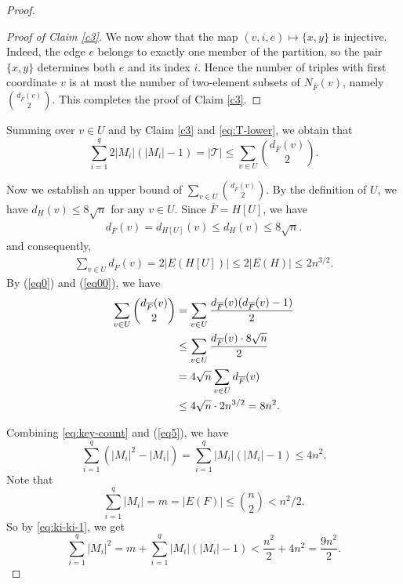 \documentclass[10pt,a4paper]{amsart}
\begin{document}
\begin{proof}
\begin{proof}[Proof of Claim \ref{c3}]
We now show that the map $(v,i,e)\mapsto \{x,y\}$ is injective.  
Indeed, the edge $e$ belongs to exactly one member of the partition, so the pair $\{x,y\}$ determines both $e$ and its index $i$.  
Hence the number of triples with first coordinate $v$ is at most the number of two-element subsets of
$N_{\overline F}(v)$, namely $\binom{d_{\overline {F}}(v)}{2}$. This completes the proof of Claim \ref{c3}.  
\end{proof}


Summing over $v\in U$ and by Claim \ref{c3} and \eqref{eq:T-lower}, we obtain that 
\begin{equation}\label{eq:key-count}
\sum_{i=1}^q 2|M_i|(|M_i|-1)=|\mathcal T|
\le \sum_{v\in U}\binom{d_{\overline {F}}(v)}{2}.
\end{equation}

Now we establish an upper bound of $\sum_{v\in U}\binom{d_{\overline {F}}(v)}{2}$.
By the definition of $U$, we have $d_H(v)\le 8\sqrt n$ for any $v\in U$.
 Since $\overline {F}=H[U]$, we have 
 \begin{align}\label{eq0}
 d_{\overline {F}}(v)=d_{H[U]}(v)\le d_H(v)\le 8\sqrt n.
 \end{align}
and consequently,
\begin{align}\label{eq00}
\sum_{v\in U}d_{\overline {F}}(v)=2|E(H[U])|
\le 2|E(H)|\le 2n^{3/2}.
\end{align}
By (\ref{eq0}) and (\ref{eq00}), we have
\begin{align}\label{eq5}
\sum_{v\in U}\binom{d_{\overline {F}}(v)}{2}&=\sum_{v\in U}\frac{d_{\overline {F}}(v)(d_{\overline {F}}(v)-1)}{2}\notag\\
&\le \sum_{v\in U} \frac{d_{\overline {F}}(v)\cdot 8\sqrt n}{2}\notag\\
&= 4\sqrt n\sum_{v\in U}d_{\overline {F}}(v)\notag\\
&\le 4\sqrt n\cdot 2n^{3/2}=8n^2.
\end{align}


Combining \eqref{eq:key-count} and (\ref{eq5}), we have
\begin{equation}\label{eq:ki-ki-1}
\sum_{i=1}^q (|M_i|^2-|M_i|)=\sum_{i=1}^q |M_i|(|M_i|-1)\le 4n^2.
\end{equation}
Note that 
\[
\sum_{i=1}^q |M_i|=m=|E(F)|\le \binom n2<n^2/2.
\]
So by  \eqref{eq:ki-ki-1}, we get
\begin{equation}\label{eq:square-sum}
\sum_{i=1}^q |M_i|^2=m+\sum_{i=1}^q  |M_i|( |M_i|-1)<\frac{n^2}{2}+4n^2=\frac{9n^2}{2}.
\end{equation}




\end{proof}
\end{document}
